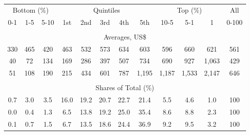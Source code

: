 \begin{tabular}{c c c| c c c c c| c c c| c}
\toprule
\multicolumn{3}{c|}{Bottom (\%)} & \multicolumn{5}{c|}{Quintiles} & \multicolumn{3}{c|}{Top (\%)} & All  \\
0-1 & 1-5 & 5-10 &  1st & 2nd & 3rd & 4th & 5th & 10-5 & 5-1 & 1 & 0-100 \\
\midrule \\
\multicolumn{12}{c}{Averages, US\$} \\
\midrule
330  & 465  & 420  & 463  & 532  & 573  & 634  & 603  & 596  & 660  & 621  & 561 \\
40 & 72 & 134 & 169 & 286 & 397 & 507 & 734 & 690 & 927 & 1,063 & 429 \\
51 & 108 & 190 & 215 & 434 & 601 & 787 & 1,195 & 1,187 & 1,533 & 2,147 & 646 \\
\midrule \\
\multicolumn{12}{c}{Shares of Total (\%)} \\
\midrule
0.7   & 3.0   & 3.5   & 16.0   & 19.2   & 20.7   & 22.7   & 21.4   & 5.5   & 4.6   & 1.0   & 100 \\
0.0  & 0.4  & 1.3  & 6.5  & 13.8  & 19.2  & 25.0  & 35.4  & 8.6  & 8.8  & 2.3  & 100 \\
0.1  & 0.7  & 1.5  & 6.7  & 13.5  & 18.6  & 24.4  & 36.9  & 9.2  & 9.5  & 3.2  & 100 \\
\bottomrule
\end{tabular}
